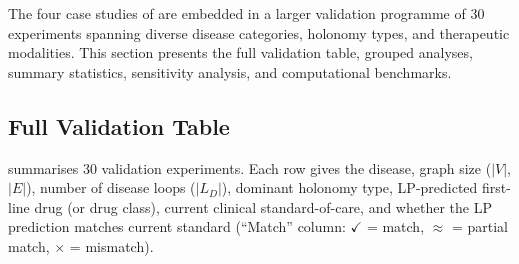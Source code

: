 The four case studies of  are embedded in a larger
validation programme of 30 experiments spanning diverse disease categories,
holonomy types, and therapeutic modalities.  This section presents the full
validation table, grouped analyses, summary statistics, sensitivity analysis,
and computational benchmarks.

\subsection{Full Validation Table}

 summarises 30 validation experiments.  Each row
gives the disease, graph size ($|V|$, $|E|$), number of disease loops
($|L_D|$), dominant holonomy type, LP-predicted first-line drug (or drug class),
current clinical standard-of-care, and whether the LP prediction matches
current standard (``Match'' column: $\checkmark$ = match, $\approx$ = partial
match, $\times$ = mismatch).

